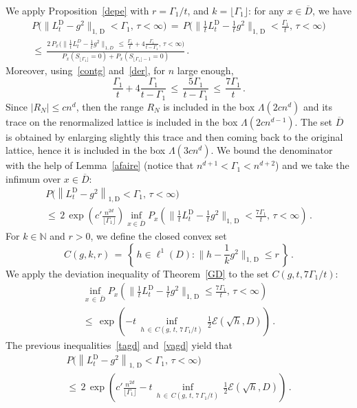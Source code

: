 \documentclass[10pt]{amsart}
\theoremstyle{definition}\newtheorem{defi}[theo]{Definition}\newtheorem{rema}[theo]{Remark}\newtheorem{exam}[theo]{Example}\newtheorem{exem}[theo]{Example}\newtheorem{nota}[theo]{Notation}
\newcommand*\bD{\overline{D}}
\newcommand*\tD{\mathrm{D}}%
\newcommand*\N {{\mathbb N}}
\newcommand*\La {{\Lambda}}
\newcommand{\cE}{\mathcal{E}}
\renewcommand{\N}{\mathbb{N}}
\begin{document}
We apply Proposition~\ref{depe} with $r=\Gamma_1/t$, and $k=\lfloor\Gamma_1\rfloor$: for any $x\in\bD$, we have
\begin{multline*}
P\big(\|L_t^{\tD}-g^2\|_{1,\,\tD}<\Gamma_1,\,\tau<\infty
\big)\,=\, P\Big(
\Big\|\frac{1}{t}L_t^{\tD}-\frac{1}{t}g^2\Big\|_{1,\,\tD}<
\frac{\Gamma_1}{t},\,\tau<\infty
\Big)\\
\leq\,
\frac{\displaystyle 2\, P_x\Big(
\Big\|\frac{1}{t}L_t^D-
\frac{1}{t}g^2
\Big\|_{1,D}\,\leq\,
\frac{\Gamma_1}{t} +4\frac{\Gamma_1}{t-\Gamma_1},\,\tau<\infty
\Big)} {\displaystyle P_x(S_{
\lfloor\Gamma_1\rfloor }=0)+ P_x(S_{
\lfloor\Gamma_1\rfloor -1}=0)}\,.
\end{multline*}
Moreover, using~\eqref{contg} and~\eqref{der}, for $n$ large enough,
\[
\frac{\Gamma_1}{t} +4\frac{\Gamma_1}{t-\Gamma_1}\,\leq\,
\frac{5\Gamma_1}{t-\Gamma_1}
\,\leq\, \frac{7\Gamma_1}{t}
\,.
\]
Since $|R_N|\leq cn^d$, then the range $R_N$ is included in the box $\La(2cn^d)$ and its trace on the renormalized lattice is included in the box $\La(2cn^{d-1})$. The set $\bD$ is obtained by enlarging slightly this trace and then coming back to the original lattice, hence it is included in the box $\La(3cn^{d})$. We bound the denominator with the help of Lemma~\ref{afaire} (notice that $n^{d+1}<\Gamma_1<n^{d+2}$) and we take the infimum over $x\in\bD$:
\begin{multline}\label{tagd}
P\big(\left\|L_t^{\tD}-g^2
\right\|_{1,\tD}<\Gamma_1,\,\tau<\infty
\big)
\\
\leq \,2 \,\exp\left(c'\frac{n^{2d}}{\lfloor\Gamma_1\rfloor}\right)
\inf_{x\in \bD} P_x\left(
\Big\|\frac{1}{t}L_t^{\tD}-\frac{1}{t}g^2\Big\|_{1,\,\tD}<
\frac{7\Gamma_1}{t},\,\tau<\infty
\right)\,.
\end{multline}
For $k\in\N$ and $r>0$, we define the closed convex set
\[
C(g,k,r)\,=\,\left\{\,
h\in\ell^1(D):
\Big\|h-\frac{1}{k}g^2\Big\|_{1,\,\tD}\leq r
\,\right\}\,.
\]
We apply the deviation inequality of Theorem~\ref{GD} to the set $C(g,t, {7\Gamma_1}/{t})$:
\begin{multline}\label{vagd}
\inf_{x\,\in\,\bD} P_x\left(
\Big\|\frac{1}{t}L_t^{\tD}-\frac{1}{t}g^2\Big\|_{1,\,\tD}\leq\frac{7\Gamma_1}{t},\,\tau<\infty\right)\\
\leq\,\exp\left(-t\,\inf_{h\,\in\,C(g,\,t,\, {7\,\Gamma_1}/{t}) }\,\frac{1}{2}\cE(\sqrt{h},D) \right)
\,.
\end{multline}
The previous inequalities~\eqref{tagd} and~\eqref{vagd} yield that
\begin{multline}\label{agd}
P\big(\left\|L_t^{\tD}-g^2\right\|_{1,\,\tD}<\Gamma_1,\,\tau<\infty\big)\\
\leq\, 2 \, \exp\left(c'\frac{n^{2d}}{\lfloor\Gamma_1\rfloor} -t\,\inf_{h\,\in\,C(g,\,t,\, {7\,\Gamma_1}/{t}) }\,\frac{1}{2}\cE(\sqrt{h},D) \right)
\,.
\end{multline}
\end{document}
